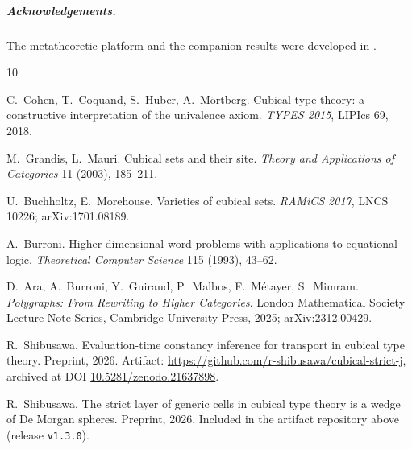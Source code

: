 \documentclass[11pt]{amsart}
\theoremstyle{definition}
\begin{document}
\subparagraph*{Acknowledgements.}  The metatheoretic platform and
the companion results were developed in \cite{Const,Sphere}.

\begin{thebibliography}{10}

C.~Cohen, T.~Coquand, S.~Huber, A.~M\"ortberg.
\newblock Cubical type theory: a constructive interpretation of the
  univalence axiom.
\newblock \emph{TYPES 2015}, LIPIcs 69, 2018.

M.~Grandis, L.~Mauri.
\newblock Cubical sets and their site.
\newblock \emph{Theory and Applications of Categories} 11 (2003),
  185--211.

U.~Buchholtz, E.~Morehouse.
\newblock Varieties of cubical sets.
\newblock \emph{RAMiCS 2017}, LNCS 10226; arXiv:1701.08189.

A.~Burroni.
\newblock Higher-dimensional word problems with applications to
  equational logic.
\newblock \emph{Theoretical Computer Science} 115 (1993), 43--62.

D.~Ara, A.~Burroni, Y.~Guiraud, P.~Malbos, F.~M\'etayer,
S.~Mimram.
\newblock \emph{Polygraphs: From Rewriting to Higher Categories}.
\newblock London Mathematical Society Lecture Note Series,
  Cambridge University Press, 2025; arXiv:2312.00429.

R.~Shibusawa.
\newblock Evaluation-time constancy inference for transport in
  cubical type theory.
\newblock Preprint, 2026.  Artifact:
  \url{https://github.com/r-shibusawa/cubical-strict-j}, archived
  at DOI \href{https://doi.org/10.5281/zenodo.21637898}%
  {10.5281/zenodo.21637898}.

R.~Shibusawa.
\newblock The strict layer of generic cells in cubical type theory
  is a wedge of De Morgan spheres.
\newblock Preprint, 2026.  Included in the artifact repository
  above (release \texttt{v1.3.0}).

\end{thebibliography}
\end{document}
